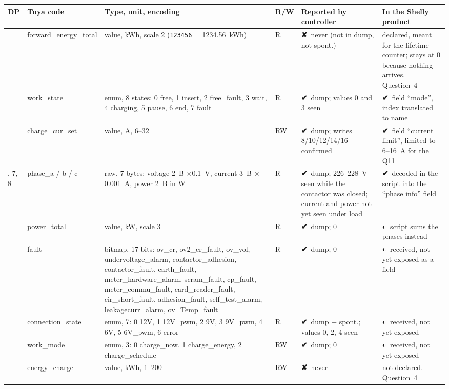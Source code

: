 \documentclass[11pt,a4paper]{article}
\newcommand{\ok}{{\symbolfont\color{apgreen}\textbf{✔}}}
\newcommand{\half}{{\symbolfont\color{apwarn}\textbf{◐}}}
\newcommand{\no}{{\symbolfont\color{apred}\textbf{✘}}}
\newcommand{\hx}[1]{\texttt{#1}}
\begin{document}
\begin{longtable}{>{\raggedright\arraybackslash}p{0.7cm}>{\raggedright\arraybackslash}p{3.1cm}>{\raggedright\arraybackslash}p{3.6cm}>{\raggedright\arraybackslash}p{0.9cm}>{\raggedright\arraybackslash}p{3.2cm}>{\raggedright\arraybackslash}p{3.8cm}}
\toprule
\rowcolor{aphead}\textbf{DP} & \textbf{Tuya code} & \textbf{Type, unit, encoding} & \textbf{R/W} & \textbf{Reported by controller} & \textbf{In the Shelly product} \\
\midrule\endhead
\bottomrule\endfoot
1 & forward\_\allowbreak energy\_\allowbreak total & value, kWh, scale 2 (\hx{123456} = 1234.56~kWh) & R & \no\ never (not in dump, not spont.) & declared, meant for the lifetime counter; stays at 0 because nothing arrives. Question~4 \\
3 & work\_state & enum, 8 states: 0 free, 1 insert, 2 free\_fault, 3 wait, 4 charging, 5 pause, 6 end, 7 fault & R & \ok\ dump; values 0 and 3 seen & \ok\ field ``mode'', index translated to name \\
4 & charge\_cur\_set & value, A, 6--32 & RW & \ok\ dump; writes 8/10/12/14/16 confirmed & \ok\ field ``current limit'', limited to 6--16~A for the Q11 \\
6, 7, 8 & phase\_a / b / c & raw, 7 bytes: voltage 2~B $\times$0.1~V, current 3~B $\times$0.001~A, power 2~B in W & R & \ok\ dump; 226--228~V seen while the contactor was closed; current and power not yet seen under load & \ok\ decoded in the script into the ``phase info'' field \\
9 & power\_total & value, kW, scale 3 & R & \ok\ dump; 0 & \half\ script sums the phases instead \\
10 & fault & bitmap, 17 bits: ov\_cr, ov2\_cr\_fault, ov\_vol, undervoltage\_alarm, contactor\_adhesion, contactor\_fault, earth\_fault, meter\_hardware\_alarm, scram\_fault, cp\_fault, meter\_commu\_fault, card\_reader\_fault, cir\_short\_fault, adhesion\_fault, self\_test\_alarm, leakagecurr\_alarm, ov\_Temp\_fault & R & \ok\ dump; 0 & \half\ received, not yet exposed as a field \\
13 & connection\_state & enum, 7: 0 12V, 1 12V\_pwm, 2 9V, 3 9V\_pwm, 4 6V, 5 6V\_pwm, 6 error & R & \ok\ dump + spont.; values 0, 2, 4 seen & \half\ received, not yet exposed \\
14 & work\_mode & enum, 3: 0 charge\_now, 1 charge\_energy, 2 charge\_schedule & RW & \ok\ dump; 0 & \half\ received, not yet exposed \\
17 & energy\_charge & value, kWh, 1--200 & RW & \no\ never & not declared. Question~4 \\

\end{longtable}
\end{document}
